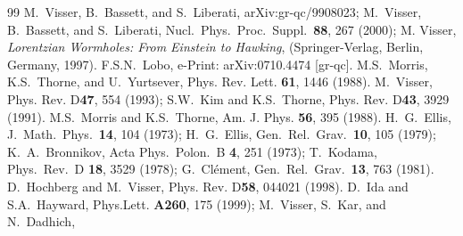 \documentclass[aps,prd,twocolumn,eqsecnum,showpacs,amsmath]{revtex4}
\begin{document}
\begin{thebibliography}{99}
  M.~Visser, B.~Bassett, and S.~Liberati,
  arXiv:gr-qc/9908023;
  M.~Visser, B.~Bassett, and S.~Liberati,
  Nucl.\ Phys.\ Proc.\ Suppl.\  {\bf 88}, 267 (2000);
M. Visser, {\it Lorentzian Wormholes: From Einstein to Hawking},
(Springer-Verlag, Berlin, Germany, 1997).
F.S.N.~Lobo, 
e-Print: arXiv:0710.4474 [gr-qc]. 
M.S.~Morris, K.S.~Thorne, and U.~Yurtsever, 
Phys. Rev. Lett. {\bf 61}, 1446 (1988).
M.~Visser,
Phys. Rev. D{\bf 47}, 554 (1993);
S.W.~Kim and K.S.~Thorne, 
Phys. Rev. D{\bf 43}, 3929 (1991). 
M.S.~Morris and K.S.~Thorne,
Am. J. Phys. {\bf 56}, 395 (1988).
  H.~G.~Ellis,
  J.\ Math.\ Phys.\  {\bf 14}, 104 (1973);
  H.~G.~Ellis,
  Gen.\ Rel.\ Grav.\  {\bf 10}, 105 (1979);
  K.~A.~Bronnikov,
  Acta Phys.\ Polon.\  B {\bf 4}, 251 (1973);
  T.~Kodama,
  Phys.\ Rev.\  D {\bf 18}, 3529 (1978);
  G.~Cl{\'e}ment,
  Gen.\ Rel.\ Grav.\  {\bf 13}, 763 (1981).
D.~Hochberg and M.~Visser,
Phys. Rev. D{\bf 58}, 044021 (1998).
D.~Ida and S.A.~Hayward, 
Phys.Lett. {\bf A260}, 175 (1999); 
M.~Visser, S.~Kar, and N.~Dadhich,

\end{thebibliography}
\end{document}
